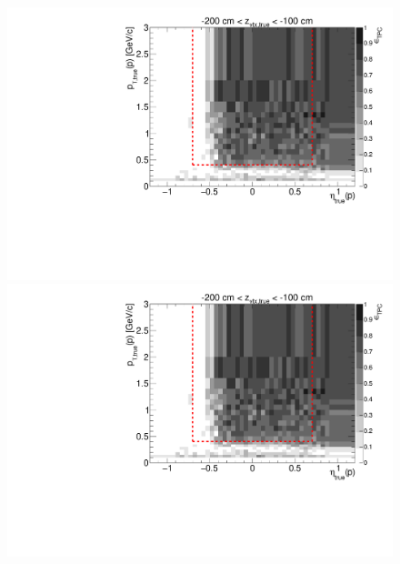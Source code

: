 \begin{figure}[hb]
{  \includegraphics[width=\linewidth,page=16]{graphics/eff/Eff2D_TPC_proton_Minus.pdf}\\
  \includegraphics[width=\linewidth,page=18]{graphics/eff/Eff2D_TPC_proton_Minus.pdf}
}%
\end{figure}



